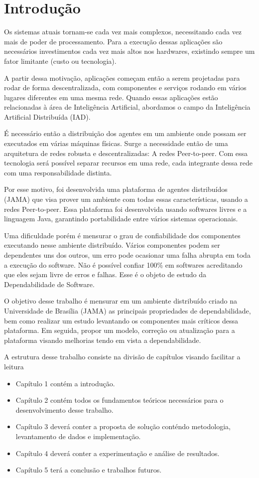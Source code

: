 \chapter{Introdução}

Os sistemas atuais tornam-se cada vez mais complexos, necessitando cada vez mais de poder de processamento. Para a execução dessas aplicações são necessários investimentos cada vez mais altos nos hardwares, existindo sempre um fator limitante (custo ou tecnologia).

A partir dessa motivação, aplicações começam então a serem projetadas para rodar de forma descentralizada, com componentes e serviços rodando em vários lugares diferentes em uma mesma rede. Quando essas aplicações estão relacionadas à área de Inteligência Artificial, abordamos o campo da Inteligência Artificial Distribuída (IAD).

É necessário então a distribuição dos agentes em um ambiente onde possam ser executados em várias máquinas físicas. Surge a necessidade então de uma arquitetura de redes robusta e descentralizadas: A redes Peer-to-peer. Com essa tecnologia será possível separar recursos em uma rede, cada integrante dessa rede com uma responsabilidade distinta.

Por esse motivo, foi desenvolvida uma plataforma de agentes distribuídos (JAMA) que visa prover um ambiente com todas essas características, usando a redes Peer-to-peer. Essa plataforma foi desenvolvida usando softwares livres e a linguagem Java, garantindo portabilidade entre vários sistemas operacionais.

Uma dificuldade porém é mensurar o grau de confiabilidade dos componentes executando nesse ambiente distribuído. Vários componentes podem ser dependentes uns dos outros, um erro pode ocasionar uma falha abrupta em toda a execução do software. Não é possível confiar 100\% em softwares acreditando que eles sejam livre de erros e falhas. Esse é o objeto de estudo da Dependabilidade de Software.

O objetivo desse trabalho é mensurar em um ambiente distribuído criado na Universidade de Brasília (JAMA) as principais propriedades de dependabilidade, bem como realizar um estudo levantando os componentes mais críticos dessa plataforma. Em seguida, propor um modelo, correção ou atualização para a plataforma visando melhorias tendo em vista a dependabilidade.

A estrutura desse trabalho consiste na divisão de capítulos visando facilitar a leitura
\begin{itemize}
	\item Capítulo 1 contém a introdução.
	\item Capítulo 2 contém todos os fundamentos teóricos necessários para o desenvolvimento desse trabalho.
	\item Capítulo 3 deverá conter a proposta de solução conténdo metodologia, levantamento de dados e implementação.
	\item Capítulo 4 deverá conter a experimentação e análise de resultados.
	\item Capítulo 5 terá a conclusão e trabalhos futuros.
\end{itemize}
